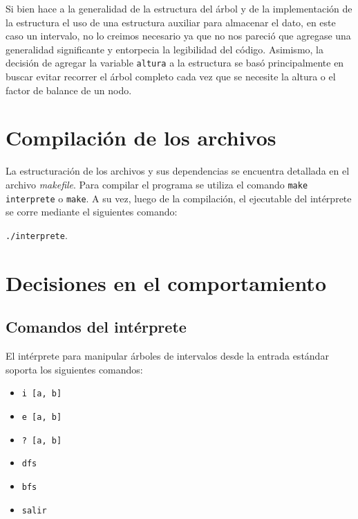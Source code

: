 \documentclass[11pt]{article}
\begin{document}
Si bien hace a la generalidad de la estructura del árbol y de la implementación de la estructura el uso de una estructura auxiliar para almacenar el dato, en este caso un intervalo, no lo creimos necesario ya que no nos pareció que agregase una generalidad significante y entorpecia la legibilidad del código.
Asimismo, la decisión de agregar la variable \verb|altura| a la estructura se basó principalmente en buscar evitar recorrer el árbol completo cada vez que se necesite la altura o el factor de balance de un nodo.\par


\section{Compilación de los archivos}

La estructuración de los archivos y sus dependencias se encuentra detallada en el archivo \textit{makefile}. 
Para compilar el programa se utiliza el comando \verb|make interprete| o \verb|make|. A su vez, luego de la compilación, el ejecutable del intérprete se corre mediante el siguientes comando:\par

\noindent \verb|./interprete|. \par


\section{Decisiones en el comportamiento}

\subsection{Comandos del intérprete}

El intérprete para manipular árboles de intervalos desde la entrada estándar soporta los siguientes comandos:

\vspace{-0.5cm}
\begin{itemize}
    \item \verb|i [a, b]|
    \vspace{-0.3cm}
    \item \verb|e [a, b]|
    \vspace{-0.3cm}
    \item \verb|? [a, b]|
    \vspace{-0.3cm}
    \item \verb|dfs|
    \vspace{-0.3cm}
    \item \verb|bfs|
    \vspace{-0.3cm}
    \item \verb|salir|
\end{itemize}
\vspace{-0.5cm}
\end{document}
